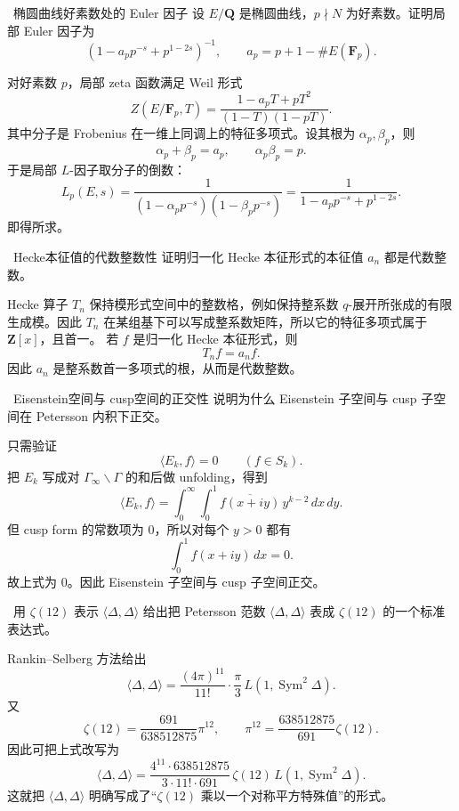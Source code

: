 \begin{problem}{\medium\ 椭圆曲线好素数处的 Euler 因子}
设 $E/\mathbf Q$ 是椭圆曲线，$p\nmid N$ 为好素数。证明局部 Euler 因子为
\[
(1-a_pp^{-s}+p^{1-2s})^{-1},
\qquad
a_p=p+1-\#E(\mathbf F_p).
\]
\end{problem}
\begin{solution}
对好素数 $p$，局部 zeta 函数满足 Weil 形式
\[
Z(E/\mathbf F_p,T)=\frac{1-a_pT+pT^2}{(1-T)(1-pT)}.
\]
其中分子是 Frobenius 在一维上同调上的特征多项式。设其根为 $\alpha_p,\beta_p$，则
\[
\alpha_p+\beta_p=a_p,\qquad \alpha_p\beta_p=p.
\]
于是局部 $L$-因子取分子的倒数：
\[
L_p(E,s)=\frac1{(1-\alpha_pp^{-s})(1-\beta_pp^{-s})}
=\frac1{1-a_pp^{-s}+p^{1-2s}}.
\]
即得所求。
\end{solution}

\begin{problem}{\medium\ Hecke本征值的代数整数性}
证明归一化 Hecke 本征形式的本征值 $a_n$ 都是代数整数。
\end{problem}
\begin{solution}
Hecke 算子 $T_n$ 保持模形式空间中的整数格，例如保持整系数 $q$-展开所张成的有限生成模。因此 $T_n$ 在某组基下可以写成整系数矩阵，所以它的特征多项式属于 $\mathbf Z[x]$，且首一。
若 $f$ 是归一化 Hecke 本征形式，则
\[
T_nf=a_nf.
\]
因此 $a_n$ 是整系数首一多项式的根，从而是代数整数。
\end{solution}

\begin{problem}{\medium\ Eisenstein空间与 cusp空间的正交性}
说明为什么 Eisenstein 子空间与 cusp 子空间在 Petersson 内积下正交。
\end{problem}
\begin{solution}
只需验证
\[
\langle E_k,f\rangle=0\qquad (f\in S_k).
\]
把 $E_k$ 写成对 $\Gamma_\infty\backslash\Gamma$ 的和后做 unfolding，得到
\[
\langle E_k,f\rangle
=
\int_0^\infty\int_0^1 \overline{f(x+iy)}\,y^{k-2}\,dx\,dy.
\]
但 cusp form 的常数项为 $0$，所以对每个 $y>0$ 都有
\[
\int_0^1 f(x+iy)\,dx=0.
\]
故上式为 $0$。因此 Eisenstein 子空间与 cusp 子空间正交。
\end{solution}

\begin{problem}{\medium\ 用 $\zeta(12)$ 表示 $\langle \Delta,\Delta\rangle$}
给出把 Petersson 范数 $\langle \Delta,\Delta\rangle$ 表成 $\zeta(12)$ 的一个标准表达式。
\end{problem}
\begin{solution}
Rankin--Selberg 方法给出
\[
\langle \Delta,\Delta\rangle
=
\frac{(4\pi)^{11}}{11!}\cdot\frac{\pi}{3}\,
L(1,\operatorname{Sym}^2\Delta).
\]
又
\[
\zeta(12)=\frac{691}{638512875}\pi^{12},
\qquad
\pi^{12}=\frac{638512875}{691}\zeta(12).
\]
因此可把上式改写为
\[
\langle \Delta,\Delta\rangle
=
\frac{4^{11}\cdot 638512875}{3\cdot 11!\cdot 691}\,
\zeta(12)\,L(1,\operatorname{Sym}^2\Delta).
\]
这就把 $\langle \Delta,\Delta\rangle$ 明确写成了“$\zeta(12)$ 乘以一个对称平方特殊值”的形式。
\end{solution}

